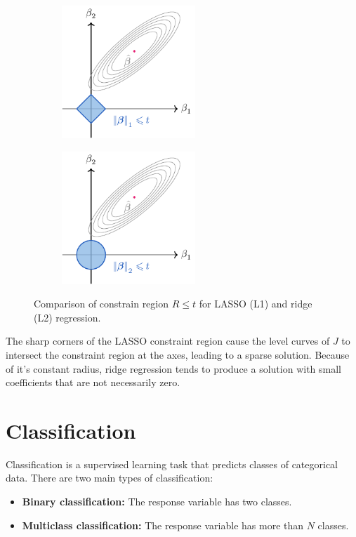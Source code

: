 \documentclass{article}
\begin{document}
\begin{figure}[H]
    \centering
    \begin{subfigure}[t]{0.48\linewidth}
        \centering
        \includegraphics[height = 5cm]{figures/lasso.pdf}
    \end{subfigure}
    \begin{subfigure}[t]{0.48\linewidth}
        \centering
        \includegraphics[height = 5cm]{figures/ridge.pdf}
    \end{subfigure}
    \caption{Comparison of constrain region \(R \leqslant t\) for LASSO (L1) and ridge (L2) regression.} %
\end{figure}
The sharp corners of the LASSO constraint region cause the level curves
of \(J\) to intersect the constraint region at the axes, leading to a
sparse solution. Because of it's constant radius, ridge regression tends
to produce a solution with small coefficients that are not necessarily
zero.
\section{Classification}
Classification is a supervised learning task that predicts classes of
categorical data. There are two main types of classification:
\begin{itemize}
    \item \textbf{Binary classification:} The response variable has two classes.
    \item \textbf{Multiclass classification:} The response variable has more than
          \(N\) classes.
\end{itemize}
\end{document}
